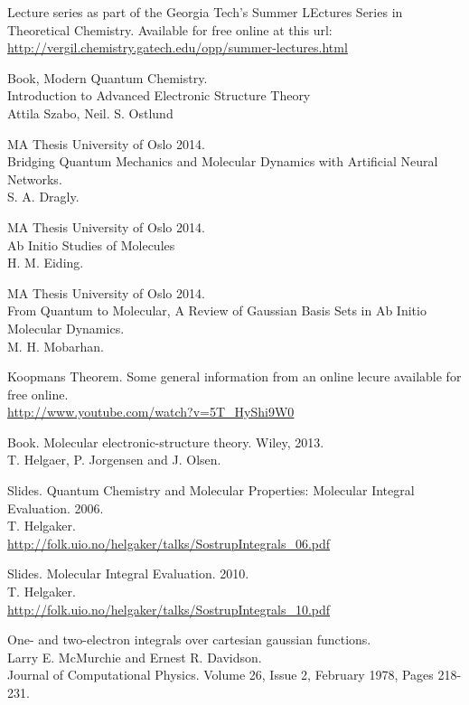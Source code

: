 \documentclass[a4paper,norsk,11pt,twoside]{report}
\begin{document}
\begin{thebibliography}{}

Lecture series as part of the Georgia Tech's Summer LEctures Series in Theoretical Chemistry. Available for free online at this url: \\
\url{http://vergil.chemistry.gatech.edu/opp/summer-lectures.html}

Book, Modern Quantum Chemistry. \\
Introduction to Advanced Electronic Structure Theory \\
Attila Szabo, Neil. S. Ostlund

MA Thesis University of Oslo 2014.\\
Bridging Quantum Mechanics and Molecular Dynamics with Artificial Neural Networks. \\
S. A. Dragly. 

MA Thesis University of Oslo 2014. \\
Ab Initio Studies of Molecules \\
H. M. Eiding.

MA Thesis University of Oslo 2014. \\
From Quantum to Molecular, A Review of Gaussian Basis Sets in Ab Initio Molecular Dynamics. \\
M. H. Mobarhan.

Koopmans Theorem. Some general information from an online lecure available for free online. \\
\url{http://www.youtube.com/watch?v=5T_HyShi9W0}

Book. Molecular electronic-structure theory. Wiley, 2013. \\
T. Helgaer, P. Jorgensen and J. Olsen.

Slides. Quantum Chemistry and Molecular Properties: Molecular Integral Evaluation. 2006. \\
T. Helgaker. \\
\url{http://folk.uio.no/helgaker/talks/SostrupIntegrals_06.pdf}

Slides. Molecular Integral Evaluation. 2010. \\
T. Helgaker. \\
\url{http://folk.uio.no/helgaker/talks/SostrupIntegrals_10.pdf}

One- and two-electron integrals over cartesian gaussian functions. \\
Larry E. McMurchie and Ernest R. Davidson. \\
Journal of Computational Physics. Volume 26, Issue 2, February 1978, Pages 218-231.


\end{thebibliography}
\end{document}
